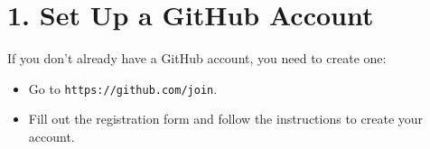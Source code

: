 \documentclass[12pt, a4paper]{article}
\begin{document}
\vspace{1.3cm}

\section*{\textcolor{blue!60}{1. Set Up a GitHub Account}}

\textmd{If you don’t already have a GitHub account, you need to create one:}
\begin{itemize}
    \item Go to \texttt{https://github.com/join}.
    \item Fill out the registration form and follow the instructions to create your account.
\end{itemize}

\vspace{1cm}
\end{document}
